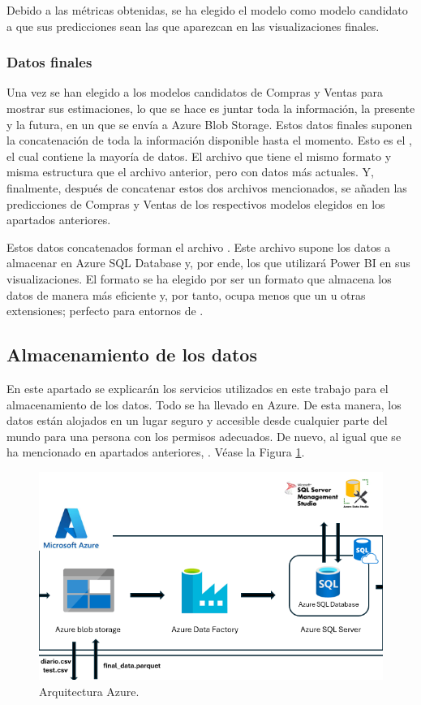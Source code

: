 Debido a las métricas obtenidas, se ha elegido el modelo  como modelo candidato a que sus predicciones sean las que aparezcan en las visualizaciones finales.

\subsubsection{Datos finales}
Una vez se han elegido a los modelos candidatos de Compras y Ventas para mostrar sus estimaciones, lo que se hace es juntar toda la información, la presente y la futura, en un  que se envía a Azure Blob Storage. Estos datos finales suponen la concatenación de toda la información disponible hasta el momento. Esto es el , el cual contiene la mayoría de datos. El archivo  que tiene el mismo formato y misma estructura que el archivo anterior, pero con datos más actuales. Y, finalmente, después de concatenar estos dos archivos mencionados, se añaden las predicciones de Compras y Ventas de los respectivos modelos elegidos en los apartados anteriores.

Estos  datos concatenados forman el archivo .  Este archivo supone los datos a almacenar en Azure SQL Database y, por ende, los que utilizará Power BI en sus visualizaciones. El formato  se ha elegido por ser un formato que almacena los datos de manera más eficiente y, por tanto, ocupa menos que un  u otras extensiones; perfecto para entornos de .

\subsection{Almacenamiento de los datos}
En este apartado se explicarán los servicios utilizados en este trabajo para el almacenamiento de los datos. Todo se ha llevado en Azure. De esta manera, los datos están alojados en un lugar seguro y accesible desde cualquier parte del mundo para una persona con los permisos adecuados. De nuevo, al igual que se ha mencionado en apartados anteriores, . Véase la Figura \ref{azure}.

\begin{figure}[H]
    \centering
    \includegraphics[scale = 0.65]{imgs/azure.png}
    \caption{Arquitectura Azure.}
    \label{azure}
\end{figure}

